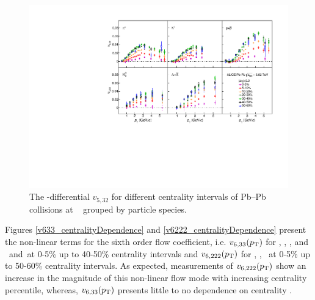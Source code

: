 \begin{figure}[!htb]
\begin{center}
\includegraphics[scale=0.82]{figures/results/All_v523_gap00_CentDep_PID2.pdf}
\end{center}
\caption{The \pT-differential $v_{5,32}$ for different centrality intervals of Pb--Pb collisions at \sNN~ grouped by particle species.}
\label{v523_centralityDependence}
\end{figure}

Figures \ref{v633_centralityDependence} and \ref{v6222_centralityDependence} present the non-linear terms for the sixth order flow coefficient, i.e. $v_{6,33}(p_{\rm{T}})$ for \pion, \kaon, \Ks, \proton and \lambdas~and~at 0-5\% up to 40-50\% centrality intervals and $v_{6,222}(p_{\rm{T}})$ for \pion, \kaon, \proton~at 0-5\% up to 50-60\% centrality intervals. As expected, measurements of $v_{6,222}(p_{\rm{T}})$ show an increase in the magnitude of this non-linear flow mode with increasing centrality percentile, whereas, $v_{6,33}(p_{\rm{T}})$ presents little to no dependence on centrality \cite{Acharya:2017zfg}. 

